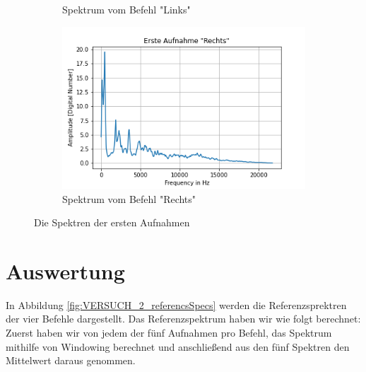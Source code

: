 \documentclass[12pt, oneside, a4paper, \docLanguage]{report}
\begin{document}
\begin{figure}[H]
\begin{subfigure}{.5\textwidth}
  		\caption{Spektrum vom Befehl "Links"}
  		\label{fig:VERSUCH_2_sub3}
	\end{subfigure}%
	\begin{subfigure}{.5\textwidth}
  		\centering
 		 \includegraphics[width=.95\linewidth]{media/ersteAufnahmeRechts.png}
  		\caption{Spektrum vom Befehl "Rechts"}
  		\label{fig:VERSUCH_2_sub4}
	\end{subfigure}
	\caption{Die Spektren der ersten Aufnahmen}
	\label{fig:VERSUCH_2_firstSpectrums}
\end{figure}
\newpage
\section{Auswertung}
\label{chap:VERSUCH_2_AUSWERTUNG}
In Abbildung \ref{fig:VERSUCH_2_referencsSpecs} werden die Referenzsprektren der vier Befehle dargestellt. Das Referenzspektrum haben wir wie folgt berechnet: Zuerst haben wir von jedem der fünf Aufnahmen pro Befehl, das Spektrum mithilfe von Windowing berechnet und anschließend aus den fünf Spektren den Mittelwert daraus genommen.
\end{document}
